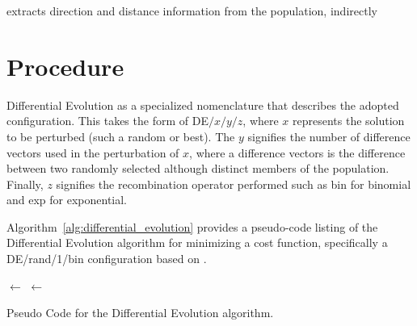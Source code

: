 \documentclass[a4paper, 11pt]{article}
\begin{document}
extracts direction and distance information from the population, indirectly


\section{Procedure}
\label{sec:procedure}
Differential Evolution as a specialized nomenclature that describes the adopted configuration. This takes the form of DE$/x/y/z$, where $x$ represents the solution to be perturbed (such a random or best). The $y$ signifies the number of difference vectors used in the perturbation of $x$, where a difference vectors is the difference between two randomly selected although distinct members of the population. Finally, $z$ signifies the recombination operator performed such as bin for binomial and exp for exponential. 

Algorithm~\ref{alg:differential_evolution} provides a pseudo-code listing of the Differential Evolution algorithm for minimizing a cost function, specifically a DE/rand/1/bin configuration based on \cite{Storn1997}. 

\begin{algorithm}[htp]
	\SetLine  

	
	
  
	\KwIn{\PopulationSize, \NumParameters, \WeightingFactor, \CrossoverRate}		
	\KwOut{\Best}
	\Population $\leftarrow$ \InitializePopulation{\PopulationSize, \NumParameters}\;
	\EvaluateCost{\Population}\;
	\Best $\leftarrow$ \GetBestSolution{\Population}\;
	\While{$\neg$\StopCondition{}} {
		
		
	}
	\Return{\Best}\;
	\caption{Pseudo Code for the Differential Evolution algorithm.}
	\label{alg:differential_evolution}
\end{algorithm}
\end{document}
